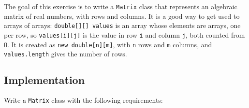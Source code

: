 The goal of this exercise is to write a \texttt{Matrix} class that represents an algebraic matrix of real numbers, with rows and columns. It is a good way to get used to arrays of arrays: \texttt{double[][] values} is an array whose elements are arrays, one per row, so \texttt{values[i][j]} is the value in row \texttt{i} and column \texttt{j}, both counted from 0. It is created as \texttt{new double[n][m]}, with \texttt{n} rows and \texttt{m} columns, and \texttt{values.length} gives the number of rows.

\subsection{Implementation}

Write a \texttt{Matrix} class with the following requirements:

